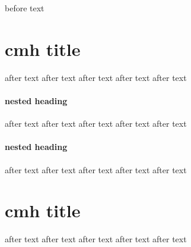 before text

\section{cmh title}
after text
after text
after text
after text
after text

\paragraph{nested heading}
after text
after text
after text
after text
after text

\paragraph{nested heading}
after text
after text
after text
after text
after text

\section{cmh title}
after text
after text
after text
after text
after text
